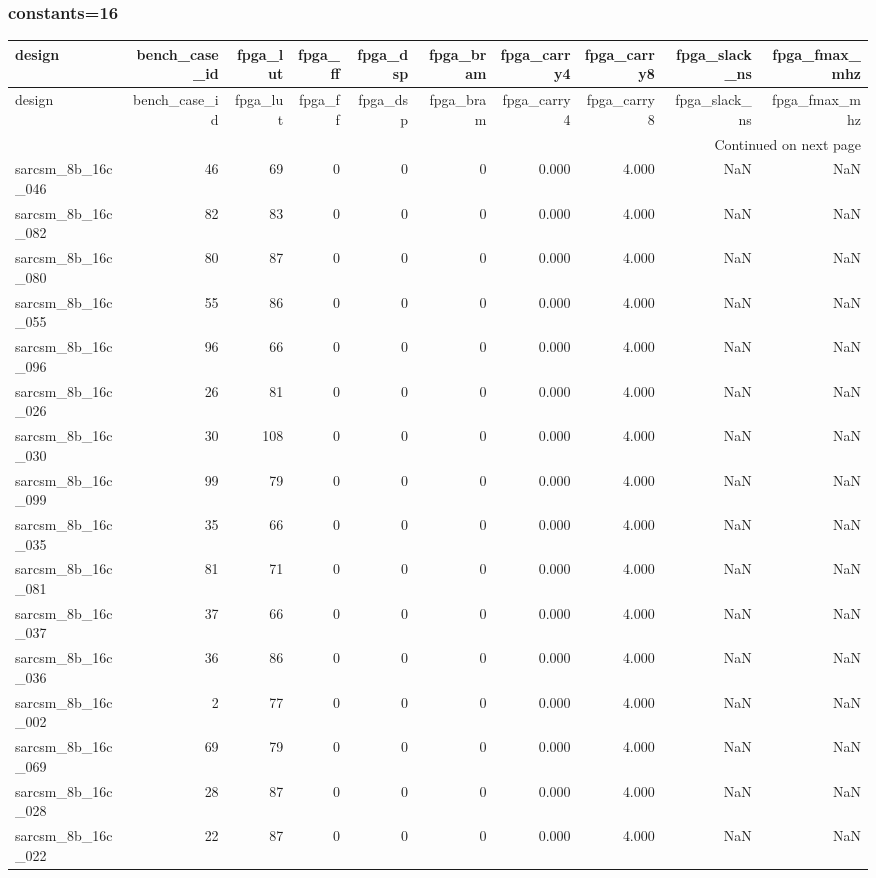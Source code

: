 \documentclass{article}
\begin{document}
\subsubsection*{constants=16}
\begin{longtable}{lrrrrrrrrr}
\toprule
design & bench\_case\_id & fpga\_lut & fpga\_ff & fpga\_dsp & fpga\_bram & fpga\_carry4 & fpga\_carry8 & fpga\_slack\_ns & fpga\_fmax\_mhz \\
\midrule
\endfirsthead
\toprule
design & bench\_case\_id & fpga\_lut & fpga\_ff & fpga\_dsp & fpga\_bram & fpga\_carry4 & fpga\_carry8 & fpga\_slack\_ns & fpga\_fmax\_mhz \\
\midrule
\endhead
\midrule
\multicolumn{10}{r}{Continued on next page} \\
\midrule
\endfoot
\bottomrule
\endlastfoot
sarcsm\_8b\_16c\_046 & 46 & 69 & 0 & 0 & 0 & 0.000 & 4.000 & NaN & NaN \\
sarcsm\_8b\_16c\_082 & 82 & 83 & 0 & 0 & 0 & 0.000 & 4.000 & NaN & NaN \\
sarcsm\_8b\_16c\_080 & 80 & 87 & 0 & 0 & 0 & 0.000 & 4.000 & NaN & NaN \\
sarcsm\_8b\_16c\_055 & 55 & 86 & 0 & 0 & 0 & 0.000 & 4.000 & NaN & NaN \\
sarcsm\_8b\_16c\_096 & 96 & 66 & 0 & 0 & 0 & 0.000 & 4.000 & NaN & NaN \\
sarcsm\_8b\_16c\_026 & 26 & 81 & 0 & 0 & 0 & 0.000 & 4.000 & NaN & NaN \\
sarcsm\_8b\_16c\_030 & 30 & 108 & 0 & 0 & 0 & 0.000 & 4.000 & NaN & NaN \\
sarcsm\_8b\_16c\_099 & 99 & 79 & 0 & 0 & 0 & 0.000 & 4.000 & NaN & NaN \\
sarcsm\_8b\_16c\_035 & 35 & 66 & 0 & 0 & 0 & 0.000 & 4.000 & NaN & NaN \\
sarcsm\_8b\_16c\_081 & 81 & 71 & 0 & 0 & 0 & 0.000 & 4.000 & NaN & NaN \\
sarcsm\_8b\_16c\_037 & 37 & 66 & 0 & 0 & 0 & 0.000 & 4.000 & NaN & NaN \\
sarcsm\_8b\_16c\_036 & 36 & 86 & 0 & 0 & 0 & 0.000 & 4.000 & NaN & NaN \\
sarcsm\_8b\_16c\_002 & 2 & 77 & 0 & 0 & 0 & 0.000 & 4.000 & NaN & NaN \\
sarcsm\_8b\_16c\_069 & 69 & 79 & 0 & 0 & 0 & 0.000 & 4.000 & NaN & NaN \\
sarcsm\_8b\_16c\_028 & 28 & 87 & 0 & 0 & 0 & 0.000 & 4.000 & NaN & NaN \\
sarcsm\_8b\_16c\_022 & 22 & 87 & 0 & 0 & 0 & 0.000 & 4.000 & NaN & NaN \\

\end{longtable}
\end{document}
